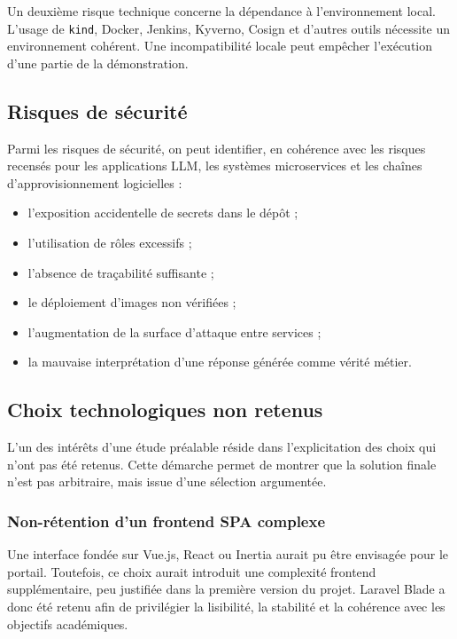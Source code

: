 Un deuxième risque technique concerne la dépendance à l’environnement local. L’usage de \texttt{kind}, Docker, Jenkins, Kyverno, Cosign et d’autres outils nécessite un environnement cohérent. Une incompatibilité locale peut empêcher l’exécution d’une partie de la démonstration.

\subsection{Risques de sécurité}

Parmi les risques de sécurité, on peut identifier, en cohérence avec les risques recensés pour les applications LLM, les systèmes microservices et les chaînes d’approvisionnement logicielles \cite{owasp_llm_top10_2025,nist_sp_800_204,slsa_spec_v1} :

\begin{itemize}
    \item l’exposition accidentelle de secrets dans le dépôt ;
    \item l’utilisation de rôles excessifs ;
    \item l’absence de traçabilité suffisante ;
    \item le déploiement d’images non vérifiées ;
    \item l’augmentation de la surface d’attaque entre services ;
    \item la mauvaise interprétation d’une réponse générée comme vérité métier.
\end{itemize}

\subsection{Choix technologiques non retenus}

L’un des intérêts d’une étude préalable réside dans l’explicitation des choix qui n’ont pas été retenus. Cette démarche permet de montrer que la solution finale n’est pas arbitraire, mais issue d’une sélection argumentée.

\subsubsection{Non-rétention d’un frontend SPA complexe}

Une interface fondée sur Vue.js, React ou Inertia aurait pu être envisagée pour le portail. Toutefois, ce choix aurait introduit une complexité frontend supplémentaire, peu justifiée dans la première version du projet. Laravel Blade a donc été retenu afin de privilégier la lisibilité, la stabilité et la cohérence avec les objectifs académiques.

